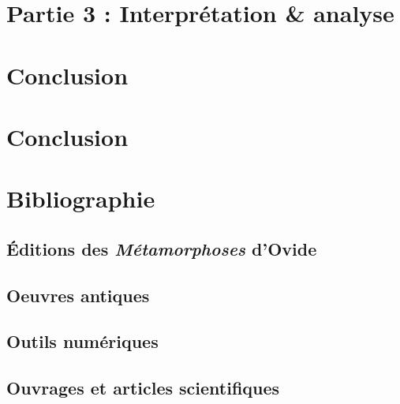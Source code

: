 \documentclass[
  letterpaper,
  DIV=11,
  numbers=noendperiod]{scrreprt}
\begin{document}

\chapter{Partie 3 : Interprétation \&
analyse}\label{partie-3-interpruxe9tation-analyse}


\chapter{Conclusion}\label{conclusion-1}


\chapter{Conclusion}\label{conclusion-2}


\chapter{Bibliographie}\label{bibliographie}

\section{\texorpdfstring{Éditions des \emph{Métamorphoses}
d'Ovide}{Éditions des Métamorphoses d'Ovide}}\label{uxe9ditions-des-muxe9tamorphoses-dovide}

\section{Oeuvres antiques}\label{oeuvres-antiques}

\section{Outils numériques}\label{outils-numuxe9riques}

\section{Ouvrages et articles
scientifiques}\label{ouvrages-et-articles-scientifiques}
\end{document}
